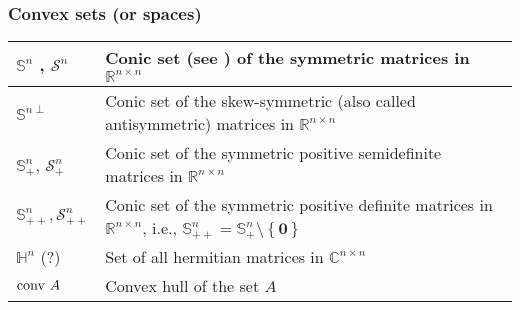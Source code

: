 \subsubsection{Convex sets (or spaces)}
\begin{xltabular}{\textwidth}{XX}
	\(\mathbb{S}^{n}\) \cite[sec. 2.2.2]{dattorroConvexOptimizationEuclidean2010}, \(\mathcal{S}^{n}\) \cite[sec. 1.6]{boydConvexOptimization2004} & Conic set (see \cite[p. 35]{boydConvexOptimization2004}) of the symmetric matrices in \(\mathbb{R}^{n\times n}\)                                                                                                                                              \\ \hline
	\(\mathbb{S}^{n\perp}\) \cite[sec. 2.2.2]{dattorroConvexOptimizationEuclidean2010}                                                   & Conic set of the skew-symmetric (also called antisymmetric) matrices in \(\mathbb{R}^{n\times n}\) \\ \hline
	\(\mathbb{S}_{+}^{n}\), \(\mathcal{S}_{+}^{n}\) \cite[sec. 2.2.5]{boydConvexOptimization2004}                                                                         & Conic set of the symmetric positive semidefinite matrices in \(\mathbb{R}^{n\times n}\) \cite{boydConvexOptimization2004}                                                                                      \\ \hline
	\(\mathbb{S}_{++}^{n}, \mathcal{S}_{++}^{n}\)   \cite[sec. 2.2.5]{boydConvexOptimization2004}                                                                         & Conic set of the symmetric positive definite matrices in \(\mathbb{R}^{n\times n}\), i.e., \(\mathbb{S}_{++}^{n} = \mathbb{S}_{+}^{n}\setminus \left\{ \mathbf{0} \right\}\) \cite{boydConvexOptimization2004} \\ \hline
	\(\mathbb{H}^{n}\) (?)                                                                                                       & Set of all hermitian matrices in \(\mathbb{C}^{n\times n}\)                                                                                                                                                    \\ \hline
	\(\textnormal{conv } A\) \cite[p. 34]{boydConvexOptimization2004}                                                                                                 & Convex hull of the set \(A\)                                                                                                                                                                                                    \\ \hline

\end{xltabular}
